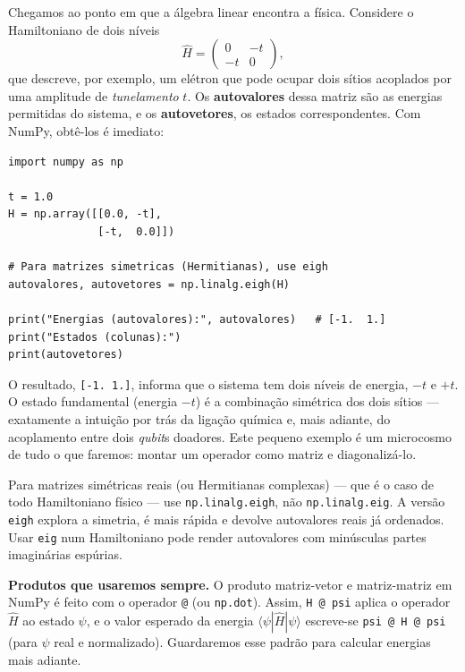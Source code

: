 \documentclass[11pt,a4paper,openany]{book}
\newcommand{\code}[1]{\texttt{#1}}
\newcommand{\numpy}{\textsf{NumPy}}
\newcommand{\qubit}{\emph{qubit}}
\begin{document}
Chegamos ao ponto em que a álgebra linear encontra a física. Considere o
Hamiltoniano de dois níveis
\[
  \hat{H} = \begin{pmatrix} 0 & -t \\ -t & 0 \end{pmatrix},
\]
que descreve, por exemplo, um elétron que pode ocupar dois sítios acoplados por
uma amplitude de \emph{tunelamento} $t$. Os \textbf{autovalores} dessa matriz são as
energias permitidas do sistema, e os \textbf{autovetores}, os estados
correspondentes. Com \numpy{}, obtê-los é imediato:

\begin{lstlisting}[style=python,caption={Autovalores e autovetores de um Hamiltoniano 2x2.},label={lst:eig}]
import numpy as np

t = 1.0
H = np.array([[0.0, -t],
              [-t,  0.0]])

# Para matrizes simetricas (Hermitianas), use eigh
autovalores, autovetores = np.linalg.eigh(H)

print("Energias (autovalores):", autovalores)   # [-1.  1.]
print("Estados (colunas):")
print(autovetores)
\end{lstlisting}

\noindent
O resultado, \code{[-1.\ 1.]}, informa que o sistema tem dois níveis de energia,
$-t$ e $+t$. O estado fundamental (energia $-t$) é a combinação simétrica dos dois
sítios --- exatamente a intuição por trás da ligação química e, mais adiante, do
acoplamento entre dois \qubit{}s doadores. Este pequeno exemplo é um microcosmo de
tudo o que faremos: montar um operador como matriz e diagonalizá-lo.

\begin{caixaatencao}
Para matrizes simétricas reais (ou Hermitianas complexas) --- que é o caso de
todo Hamiltoniano físico --- use \code{np.linalg.eigh}, não \code{np.linalg.eig}. A
versão \code{eigh} explora a simetria, é mais rápida e devolve autovalores reais já
ordenados. Usar \code{eig} num Hamiltoniano pode render autovalores com minúsculas
partes imaginárias espúrias.
\end{caixaatencao}

\begin{caixanota}
\textbf{Produtos que usaremos sempre.} O produto matriz-vetor e matriz-matriz em
\numpy{} é feito com o operador \code{@} (ou \code{np.dot}). Assim, \code{H @ psi} aplica
o operador $\hat H$ ao estado $\psi$, e o valor esperado da energia
$\langle\psi|\hat H|\psi\rangle$ escreve-se \code{psi @ H @ psi} (para $\psi$ real e
normalizado). Guardaremos esse padrão para calcular energias mais adiante.
\end{caixanota}
\end{document}
